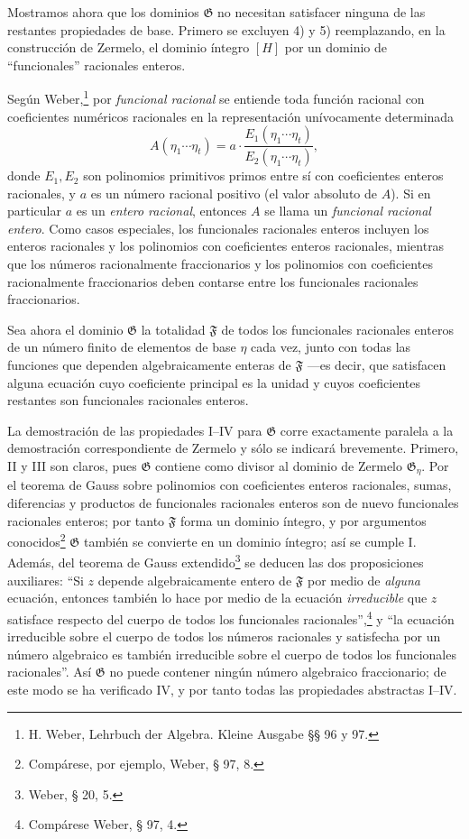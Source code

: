 Mostramos ahora que los dominios $\mathfrak G$ no necesitan satisfacer ninguna de las restantes propiedades de base. Primero se excluyen 4) y 5) reemplazando, en la construcción de Zermelo, el dominio íntegro $[H]$ por un dominio de ``funcionales'' racionales enteros.

Según Weber,\footnote{H. Weber, Lehrbuch der Algebra. Kleine Ausgabe §§ 96 y 97.} por \emph{funcional racional} se entiende toda función racional con coeficientes numéricos racionales en la representación unívocamente determinada
\[
 A(\eta_1\cdots \eta_t)
   = a\cdot\frac{E_1(\eta_1\cdots \eta_t)}{E_2(\eta_1\cdots \eta_t)},
\]
donde $E_1,E_2$ son polinomios primitivos primos entre sí con coeficientes enteros racionales, y $a$ es un número racional positivo (el valor absoluto de $A$). Si en particular $a$ es un \emph{entero racional}, entonces $A$ se llama un \emph{funcional racional entero}. Como casos especiales, los funcionales racionales enteros incluyen los enteros racionales y los polinomios con coeficientes enteros racionales, mientras que los números racionalmente fraccionarios y los polinomios con coeficientes racionalmente fraccionarios deben contarse entre los funcionales racionales fraccionarios.

Sea ahora el dominio $\mathfrak G$ la totalidad $\mathfrak F$ de todos los funcionales racionales enteros de un número finito de elementos de base $\eta$ cada vez, junto con todas las funciones que dependen algebraicamente enteras de $\mathfrak F$ ---es decir, que satisfacen alguna ecuación cuyo coeficiente principal es la unidad y cuyos coeficientes restantes son funcionales racionales enteros.

La demostración de las propiedades I--IV para $\mathfrak G$ corre exactamente paralela a la demostración correspondiente de Zermelo y sólo se indicará brevemente. Primero, II y III son claros, pues $\mathfrak G$ contiene como divisor al dominio de Zermelo $\mathfrak G_\eta$. Por el teorema de Gauss sobre polinomios con coeficientes enteros racionales, sumas, diferencias y productos de funcionales racionales enteros son de nuevo funcionales racionales enteros; por tanto $\mathfrak F$ forma un dominio íntegro, y por argumentos conocidos\footnote{Compárese, por ejemplo, Weber, § 97, 8.} $\mathfrak G$ también se convierte en un dominio íntegro; así se cumple I. Además, del teorema de Gauss extendido\footnote{Weber, § 20, 5.} se deducen las dos proposiciones auxiliares: ``Si $z$ depende algebraicamente entero de $\mathfrak F$ por medio de \emph{alguna} ecuación, entonces también lo hace por medio de la ecuación \emph{irreducible} que $z$ satisface respecto del cuerpo de todos los funcionales racionales'',\footnote{Compárese Weber, § 97, 4.} y ``la ecuación irreducible sobre el cuerpo de todos los números racionales y satisfecha por un número algebraico es también irreducible sobre el cuerpo de todos los funcionales racionales''. Así $\mathfrak G$ no puede contener ningún número algebraico fraccionario; de este modo se ha verificado IV, y por tanto todas las propiedades abstractas I--IV.

